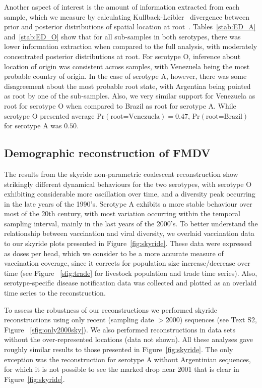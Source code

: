 \documentclass[10pt]{article}
\begin{document}
Another aspect of interest is the amount of information extracted from each sample, which we measure by calculating Kullback-Leibler~\cite{KL} divergence between prior and posterior distributions of spatial location at root~\cite{roots}.
Tables~\ref{stab:ED_A} and~\ref{stab:ED_O} show that for all sub-samples in both serotypes, there was lower information extraction when compared to the full analysis, with moderately concentrated posterior distributions at root.
For serotype O, inference about location of origin was consistent across samples, with Venezuela being the most probable country of origin.
In the case of serotype A, however, there was some disagreement about the most probable root state, with Argentina being pointed as root by one of the sub-samples.
Also, we very similar support for Venezuela as root for serotype O when compared to Brazil as root for serotype A.
While serotype O presented average $\mbox{Pr}(\text{root=Venezuela})=0.47$, $\mbox{Pr}(\text{root=Brazil})$ for serotype A was $0.50$.

\subsection*{Demographic reconstruction of FMDV}

The results from the skyride non-parametric coalescent reconstruction show strikingly different dynamical behaviours for the two serotypes, with serotype O exhibiting considerable more oscillation over time, and a diversity peak occurring in the late years of the 1990's.
Serotype A exhibits a more stable behaviour over most of the 20th century, with most variation occurring within the temporal sampling interval, mainly in the last years of the 2000's.
To better understand the relationship between vaccination and viral diversity, we overlaid vaccination data to our skyride plots presented in Figure~\ref{fig:skyride}.
These data were expressed as doses per head, which we consider to be a more accurate measure of vaccination coverage, since it corrects for population size increase/decrease over time (see Figure ~\ref{sfig:trade} for livestock population and trade time series). 
Also, serotype-specific disease notification data was collected and plotted as an overlaid time series to the reconstruction. 

To assess the robustness of our reconstructions we performed skyride reconstructions using only recent (sampling date $>2000$) sequences (see Text S2, Figure ~\ref{sfig:only2000sky}).
We also performed reconstructions in data sets without the over-represented locations (data not shown). All these analyses gave roughly similar results to those presented in Figure~\ref{fig:skyride}. The only exception was the reconstruction for serotype A without Argentinian sequences, for which it is not possible to see the marked drop near 2001 that is clear in Figure~\ref{fig:skyride}. 
\end{document}
